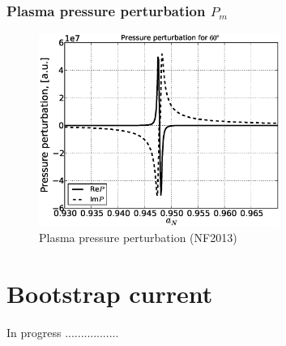\documentclass[11pt,oneside,a4paper,notitlepage]{article}
\begin{document}
\section{Plasma pressure perturbation $P_m$}
\begin{figure}[h]
 \centering
 \includegraphics[width=0.7\textwidth]{evans60/perturbation_60.eps}
 \caption{Plasma pressure perturbation (NF2013)}
 \label{fig:pert60}
\end{figure}
\newpage
\part{Bootstrap current}
In progress .................
\end{document}
